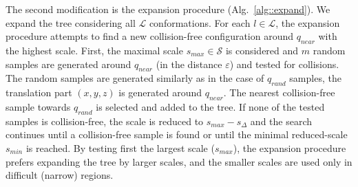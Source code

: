 \documentclass[usletter, 10pt, conference]{ieeeconf} %
\def\qrand{q_{rand}}
\def\qnear{q_{near}}
\def\da{d_{atom}}
\def\smin{s_{min}}
\def\smax{s_{max}}
\def\sdelta{s_{\Delta}}
\def\L{\mathcal{L}}
\def\S{\mathcal{S}}
\begin{document}
The second modification is the expansion procedure (Alg.~\ref{alg::expand}). %
We expand the tree considering all $\L$ conformations.
For each $l \in \L$, the expansion procedure attempts to find a new collision-free configuration around $\qnear$ with the highest scale.
First, the maximal scale $\smax \in \S$ is considered and $m$ random samples are generated around $\qnear$ (in the distance $\varepsilon$) 
and tested for collisions.
The random samples are generated similarly as in the case of $\qrand$ samples, the translation part $(x,y,z)$ is generated around $\qnear$.
The nearest collision-free sample towards $\qrand$ is selected and added to the tree.
If none of the tested samples is collision-free, the scale is reduced to $\smax-\sdelta$ and the search continues
until a collision-free sample is found or until the minimal reduced-scale $\smin$ is reached.
By testing first the largest scale ($\smax$), the expansion procedure prefers expanding the tree by larger scales, and the
smaller scales are used only in difficult (narrow) regions.



\end{document}
